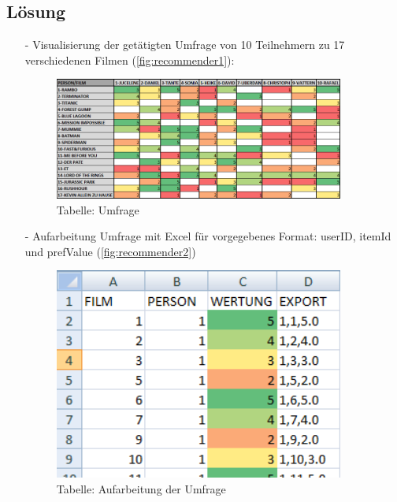 \subsection*{Lösung}
\begin{itemize}
\item[-] Visualisierung der getätigten Umfrage von 10 Teilnehmern zu 17 verschiedenen Filmen (\autoref{fig:recommender1}):
\begin{figure}[!htb]
        \begin{minipage}{1\textwidth}
                \centering
                \includegraphics[width=0.90\textwidth]{pics/recommender1.png}\par\vspace{0cm}
                \caption{Tabelle: Umfrage}
                \label{fig:recommender1}
        \end{minipage}
\end{figure}

\item[-] Aufarbeitung Umfrage mit Excel für vorgegebenes Format: userID, itemId und prefValue (\autoref{fig:recommender2})
\begin{figure}[!htb]
        \begin{minipage}{1\textwidth}
                \centering
                \includegraphics[width=0.90\textwidth]{pics/recommender2.png}\par\vspace{0cm}
                \caption{Tabelle: Aufarbeitung der Umfrage}
                \label{fig:recommender2}
        \end{minipage}
\end{figure}


\end{itemize}
